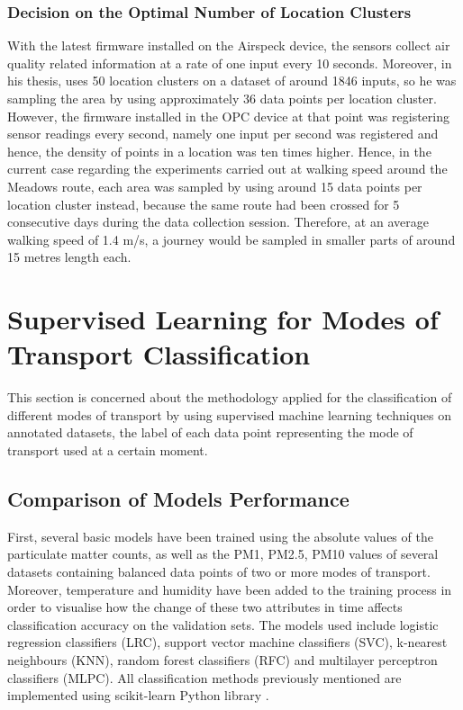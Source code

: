 \documentclass[bsc,frontabs,twoside,singlespacing, parskip,deptreport]{infthesis}     %
\begin{document}
\subsubsection*{Decision on the Optimal Number of Location Clusters}

With the latest firmware installed on the Airspeck device, the sensors collect air quality related information at a rate of one input every 10 seconds. Moreover, in his thesis, \cite{Kotsev2015} uses 50 location clusters on a dataset of around 1846 inputs, so he was sampling the area by using approximately 36 data points per location cluster. However, the firmware installed in the OPC device at that point was registering sensor readings every second, namely one input per second was registered and hence, the density of points in a location was ten times higher. Hence,  in the current case regarding the experiments carried out at walking speed around the Meadows route, each area was sampled by using around 15 data points per location cluster instead, because the same route had been crossed for 5 consecutive days during the data collection session. Therefore, at an average walking speed of 1.4 m/s, a journey would be sampled in smaller parts of around 15 metres length each.

\section{Supervised Learning for Modes of Transport Classification}

This section is concerned about the methodology applied for the classification of different modes of transport by using supervised machine learning techniques on annotated datasets, the label of each data point representing the mode of transport used at a certain moment.

\subsection{Comparison of Models Performance}

First, several basic models have been trained using the absolute values of the particulate matter counts, as well as the PM1, PM2.5, PM10 values of several datasets containing balanced data points of two or more modes of transport. Moreover, temperature and humidity have been added to the training process in order to visualise how the change of these two attributes in time affects classification accuracy on the validation sets. The models used include logistic regression classifiers (LRC), support vector machine classifiers (SVC), k-nearest neighbours (KNN), random forest classifiers (RFC) and multilayer perceptron classifiers (MLPC). All classification methods previously mentioned are implemented using scikit-learn Python library \cite{scikit-learn}.
\end{document}
